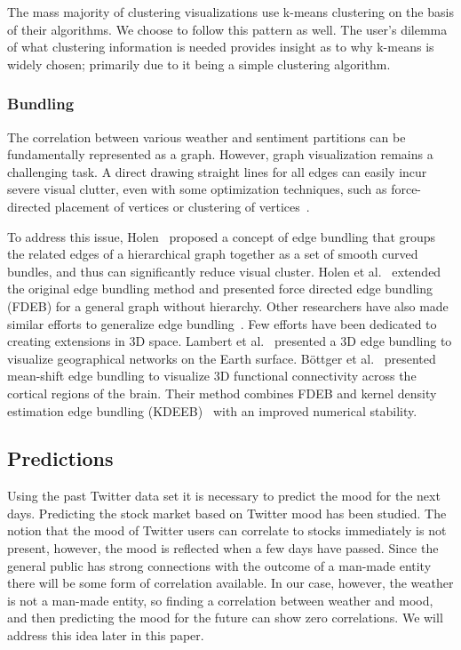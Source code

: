 \documentclass[journal]{vgtc}                %
\begin{document}
The mass majority of clustering visualizations use k-means clustering on the basis of their algorithms. \cite{li2014nasty,weber2001visualizing} We choose to follow this pattern as well. The user's dilemma of what clustering information is needed provides insight as to why k-means is widely chosen; primarily due to it being a simple clustering algorithm. \cite{weber2001visualizing}

\subsubsection{Bundling}
The correlation between various weather and sentiment partitions can be fundamentally represented as a graph. However, graph visualization remains a challenging task. A direct drawing straight lines for all edges can easily incur severe visual clutter, even with some optimization techniques, such as force-directed placement of vertices or clustering of vertices~\cite{KAUFMANN2001}.

To address this issue, Holen~\cite{holten2006hierarchical} proposed a concept of edge bundling that groups the related edges of a hierarchical graph together as a set of smooth curved bundles, and thus can significantly reduce visual cluster. Holen et al.~\cite{holten2009force} extended the original edge bundling method and presented force directed edge bundling (FDEB) for a general graph without hierarchy. Other researchers have also made similar efforts to generalize edge bundling~\cite{cui2008geometry,telea2010image,ersoy2011skeleton,gansner2011multilevel}. Few efforts have been dedicated to creating extensions in 3D space. Lambert et al.~\cite{5571244} presented a 3D edge bundling to visualize geographical networks on the Earth surface. B\"{o}ttger et al.~\cite{bottger2014three} presented mean-shift edge bundling to visualize 3D functional connectivity across the cortical regions of the brain. Their method combines FDEB and kernel density estimation edge bundling (KDEEB)~\cite{hurter2012graph} with an improved numerical stability.

\subsection{Predictions}

Using the past Twitter data set it is necessary to predict the mood for the next days. Predicting the stock market based on Twitter mood has been studied. \cite{woodring2009multiscale} The notion that the mood of Twitter users can correlate to stocks immediately is not present, however, the mood is reflected when a few days have passed. Since the general public has strong connections with the outcome of a man-made entity there will be some form of correlation available. In our case, however, the weather is not a man-made entity, so finding a correlation between weather and mood, and then predicting the mood for the future can show zero correlations. We will address this idea later in this paper.
\end{document}

